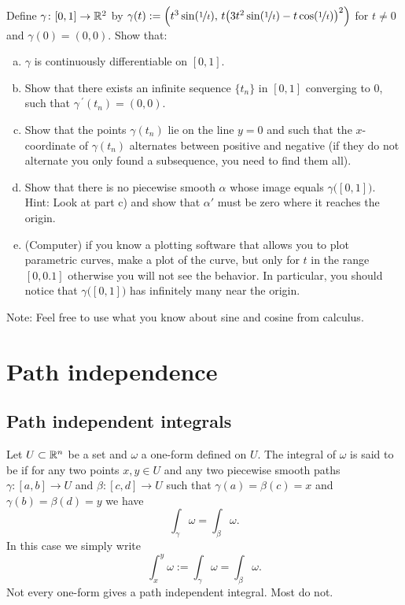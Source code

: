 \begin{exercise}
Define $\gamma \colon [0,1] \to {\mathbb{R}}^2$ by
$\gamma(t) := \Bigl( t^3 \sin(\nicefrac{1}{t}),\,
t{\bigl(3t^2\sin(\nicefrac{1}{t})-t\cos(\nicefrac{1}{t})\bigr)}^2 \Bigr)$
for
$t \not= 0$ and $\gamma(0) = (0,0)$.  Show that:
\begin{enumerate}[a)]
\item
$\gamma$ is continuously differentiable on $[0,1]$.
\item
Show that there exists an infinite sequence $\{ t_n \}$ in $[0,1]$
converging to 0, such that
$\gamma^{\:\prime}(t_n) = (0,0)$.
\item
Show that the points $\gamma(t_n)$ lie on the line $y=0$ and such
that the $x$-coordinate of $\gamma(t_n)$ alternates between positive and
negative (if they do not alternate you only found a subsequence,
you need to find them all).
\item
Show that there is no piecewise smooth $\alpha$ whose image equals
$\gamma\bigl([0,1]\bigr)$.  Hint: Look at part c) and show that $\alpha'$
must be zero where it reaches the origin.
\item
(Computer) if you know a plotting software that allows you to plot
parametric curves, make a plot of the curve, but only for $t$ in the
range $[0,0.1]$ otherwise you will not see the behavior.  In particular, you
should notice that $\gamma\bigl([0,1]\bigr)$ has infinitely many
near the origin.
\end{enumerate}
Note: Feel free to use what you know about sine and cosine from calculus.
\end{exercise}


\sectionnewpage
\section{Path independence}
\label{sec:pathind}


\subsection{Path independent integrals}

Let $U \subset {\mathbb{R}}^n$ be a set and $\omega$ a one-form defined on $U$.
The integral of $\omega$
is said to be \emph{}
if for any two points $x,y \in U$ and
any two piecewise smooth paths
$\gamma \colon [a,b] \to U$ and
$\beta \colon [c,d] \to U$ such that $\gamma(a) = \beta(c) = x$
and $\gamma(b) = \beta(d) = y$ we have
\begin{equation*}
\int_\gamma \omega = \int_\beta \omega .
\end{equation*}
In this case we simply write
\begin{equation*}
\int_x^y \omega := \int_\gamma \omega = \int_\beta \omega .
\end{equation*}
Not every one-form gives a path independent integral.  Most do not.

